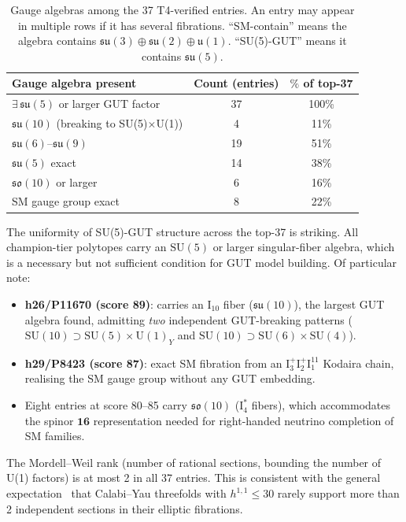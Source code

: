 \documentclass[11pt,a4paper]{article}
\begin{document}
\begin{table}[H]
\centering
\caption{Gauge algebras among the 37 T4-verified entries.
  An entry may appear in multiple rows if it has several fibrations.
  ``SM-contain'' means the algebra contains $\mathfrak{su}(3)\oplus\mathfrak{su}(2)\oplus\mathfrak{u}(1)$.
  ``SU(5)-GUT'' means it contains $\mathfrak{su}(5)$.}
\label{tab:fib_top37}
\small
\begin{tabular}{lcc}
\toprule
Gauge algebra present & Count (entries) & $\%$ of top-37 \\
\midrule
$\exists\,\mathfrak{su}(5)$ or larger GUT factor & 37 & 100\% \\
$\mathfrak{su}(10)$ (breaking to SU(5)$\times$U(1)) & 4  & 11\%  \\
$\mathfrak{su}(6)$--$\mathfrak{su}(9)$ & 19 & 51\% \\
$\mathfrak{su}(5)$ exact & 14 & 38\% \\
$\mathfrak{so}(10)$ or larger & 6  & 16\% \\
SM gauge group exact & 8  & 22\% \\
\bottomrule
\end{tabular}
\end{table}

\noindent
The uniformity of SU(5)-GUT structure across the top-37 is striking.
All champion-tier polytopes carry an $\mathrm{SU}(5)$ or larger
singular-fiber algebra, which is a necessary but not sufficient
condition for GUT model building.
Of particular note:
\begin{itemize}[noitemsep]
  \item \textbf{h26/P11670 (score 89)}: carries an $\mathrm{I}_{10}$
    fiber ($\mathfrak{su}(10)$), the largest GUT algebra found,
    admitting \emph{two} independent GUT-breaking patterns
    ($\mathrm{SU}(10)\supset\mathrm{SU}(5)\times\mathrm{U}(1)_Y$
    and $\mathrm{SU}(10)\supset\mathrm{SU}(6)\times\mathrm{SU}(4)$).
  \item \textbf{h29/P8423 (score 87)}: exact SM fibration from
    an $\mathrm{I}_3^+\mathrm{I}_2^+\mathrm{I}_1^{11}$ Kodaira
    chain, realising the SM gauge group without any GUT embedding.
  \item Eight entries at score 80--85 carry $\mathfrak{so}(10)$
    ($\mathrm{I}_4^*$ fibers), which accommodates the spinor
    $\mathbf{16}$ representation needed for right-handed neutrino
    completion of SM families.
\end{itemize}

The Mordell--Weil rank (number of rational sections, bounding the
number of U(1) factors) is at most 2 in all 37 entries.
This is consistent with the general expectation~\cite{MordellWeilHetF}
that Calabi--Yau threefolds with $h^{1,1} \leq 30$ rarely
support more than 2 independent sections in their elliptic fibrations.
\end{document}
